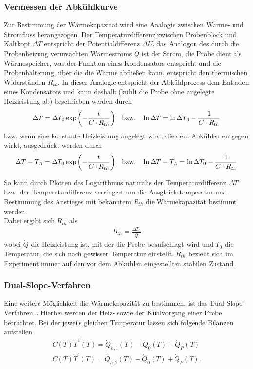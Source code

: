 \documentclass[parskip=half, a4paper,twoside,final]{article}
\begin{document}
\subsubsection{Vermessen der Abkühlkurve}\label{sec:CV_Abkühlkurve}
Zur Bestimmung der Wärmekapazität wird eine Analogie zwischen Wärme- und Stromfluss herangezogen. Der Temperaturdifferenz zwischen Probenblock und Kaltkopf $\Delta T $ entspricht der Potentialdifferenz $\Delta U$, das Analogon des durch die Probenheizung verursachten Wärmestroms $\dot{Q}$ ist der Strom, die Probe dient als Wärmespeicher, was der Funktion eines Kondensators entspricht und die Probenhalterung, über die die Wärme abfließen kann, entspricht den thermischen Widerständen $R_{th}$. In dieser Analogie entspricht der Abkühlprozess dem Entladen eines Kondensators und kann deshalb (kühlt die Probe ohne angelegte Heizleistung ab) beschrieben werden durch
\begin{align}
  \Delta T = \Delta T_0 \exp\qty(-\frac{t}{C\cdot R_{th}}) \quad \text{bzw.} \quad \ln\Delta T = \ln \Delta T_0 - \frac{1}{C\cdot R_{th}}
\end{align}
bzw. wenn eine konstante Heizleistung angelegt wird, die dem Abkühlen entgegen wirkt, ausgedrückt werden durch
\begin{align}
  \Delta T - T_A = \Delta T_0 \exp\qty(-\frac{t}{C\cdot R_{th}}) \quad \text{bzw.} \quad \ln\Delta T -T_A= \ln \Delta T_0 - \frac{1}{C\cdot R_{th}}
\end{align}

So kann durch Plotten des Logarithmus naturalis der Temperaturdifferenz $\Delta T$ bzw. der Temperaturdifferenz verringert um die Ausgleichstemperatur und Bestimmung des Anstieges mit bekanntem $R_{th}$ die Wärmekapazität bestimmt werden. \\
Dabei ergibt sich $R_{th}$ als
\begin{align}
  R_{th} = \frac{\Delta T_0}{\dot{Q}}
\end{align}
wobei $\dot{Q}$ die Heizleistung ist, mit der die Probe beaufschlagt wird und $T_0$ die Temperatur, die sich nach gewisser Temperatur einstellt. $R_{th}$ bezieht sich im Experiment immer auf den vor dem Abkühlen eingestellten stabilen Zustand.

\subsubsection{Dual-Slope-Verfahren}\label{sec:Dual-Slope}
Eine weitere Möglichkeit die Wärmekapazität zu bestimmen, ist das Dual-Slope-Verfahren~\cite{Riegel}. Hierbei werden der Heiz- sowie der Kühlvorgang einer Probe betrachtet. Bei der jeweils gleichen Temperatur lassen sich folgende Bilanzen aufstellen
\begin{align}
  C(T)\dot{T}^h (T) = \dot{Q}_{h,1} (T) - \dot{Q}_0(T)+\dot{Q}_P (T)\\
  C(T)\dot{T}^c (T) = \dot{Q}_{h,2} (T) - \dot{Q}_0(T)+\dot{Q}_P (T).
\end{align}
\end{document}
